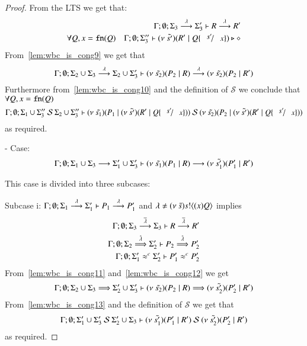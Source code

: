 \begin{proof}
	\noi From the LTS we get that:
	\begin{eqnarray}
		& &	\Gamma; \emptyset; \Sigma_3 \by{\lambda} \Sigma_3' \proves R \by{\lambda} R' \label{lem:wbc_is_cong9}\\
		\forall Q, x = \fn{Q}
		& & \Gamma; \emptyset; \Sigma_3'' \proves \newsp{\tilde{s'}}{R' \Par Q \subst{s'}{x}} \hastype \Proc \label{lem:wbc_is_cong10}
	\end{eqnarray}
%
	\noi From~\ref{lem:wbc_is_cong9} we get that
	\[
		\Gamma; \emptyset; \Sigma_2 \cup \Sigma_3 \stackrel{\lambda}{\longrightarrow} \Sigma_2 \cup \Sigma_3' \vdash (\nu\ \tilde{s_2})(P_2 \;|\; R) \stackrel{\lambda}{\longrightarrow} (\nu\ \tilde{s_2})(P_2 \;|\; R')
	\]
	\noi Furthermore from~\ref{lem:wbc_is_cong10} and the definition of $\mathcal{S}$ we conclude that
	$\forall Q, x = \mathtt{fn}(Q)$
	\[
		\Gamma; \emptyset; \Sigma_1 \cup \Sigma_3''\ \mathcal{S}\ \Sigma_2 \cup \Sigma_3'' \proves \newsp{\tilde{s_1}}{P_1 \Par \newsp{\tilde{s'}}{R' \Par Q \subst{s'}{x}}}\ \mathcal{S}\ \newsp{\tilde{s_2}}{P_2 \Par \newsp{\tilde{s'}}{R' \Par Q \subst{s'}{x}}}
	\]
	\noi as required.



	\noi - Case:
	\[
		\Gamma; \emptyset; \Sigma_1 \cup \Sigma_3 \stackrel{}{\longrightarrow} \Sigma_1' \cup \Sigma_3' \vdash (\nu\ \tilde{s_1})(P_1 \;|\; R) \stackrel{}{\longrightarrow} (\nu\ \tilde{s_1'})(P_1' \;|\; R')
	\]

	\noi This case is divided into three subcases:

	\noi Subcase i: $\Gamma; \emptyset; \Sigma_1 \stackrel{\lambda}{\longrightarrow} \Sigma_1' \vdash P_1 \stackrel{\lambda}{\longrightarrow} P_1'$
	and $\lambda \not= (\nu\ \tilde{s}) s ! \langle (x)Q \rangle$ implies
%
	\begin{eqnarray}
		\Gamma; \emptyset; \Sigma_3 \stackrel{\overline{\lambda}}{\longrightarrow} \Sigma_3 \vdash R \stackrel{\overline{\lambda}}{\longrightarrow} R' \label{lem:wbc_is_cong11} \\
		\Gamma; \emptyset; \Sigma_2 \stackrel{\hat{\lambda}}{\Longrightarrow} \Sigma_2' \vdash P_2 \stackrel{\hat{\lambda}}{\Longrightarrow} P_2' \label{lem:wbc_is_cong12}\\
		\Gamma; \emptyset; \Sigma_1' \approx^{c} \Sigma_2' \vdash P_1' \approx^{c} P_2' \label{lem:wbc_is_cong13}
	\end{eqnarray}
%
	\noi From~\ref{lem:wbc_is_cong11} and~\ref{lem:wbc_is_cong12} we get
	\[
		\Gamma; \emptyset; \Sigma_2 \cup \Sigma_3 \stackrel{}{\Longrightarrow} \Sigma_2' \cup \Sigma_3' \vdash (\nu\ \tilde{s_2})(P_2 \;|\; R) \stackrel{}{\Longrightarrow} (\nu\ \tilde{s_2'})(P_2' \;|\; R')
	\]
%
	\noi From~\ref{lem:wbc_is_cong13} and the definition of $\mathcal{S}$ we get that
	\[
		\Gamma; \emptyset; \Sigma_1' \cup \Sigma_3'\ \mathcal{S}\ \Sigma_2' \cup \Sigma_3 \proves \newsp{\tilde{s_1'}}{P_1' \Par R'}\ \mathcal{S}\ \newsp{\tilde{s_2'}}{P_2' \Par R'}
	\]
	\noi as required.


\end{proof}
